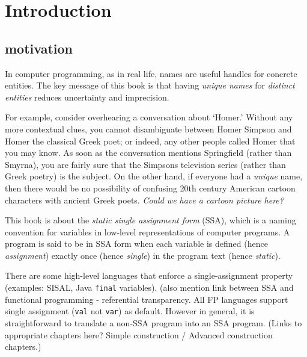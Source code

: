 \chapter{Introduction }



\section{motivation}



In computer programming, as in real life, 
names are useful handles for concrete entities.
The key message of this book is that
having \textit{unique names} for
\textit{distinct entities}
reduces uncertainty and imprecision.

For example, consider overhearing a conversation
about `Homer.' Without any more contextual clues, you
cannot disambiguate between Homer Simpson and Homer the
classical Greek poet; or indeed, any other people
called Homer that you may know.
As soon as the conversation mentions Springfield
(rather than Smyrna), you are fairly sure that the
Simpsons television series (rather than Greek poetry)
is the subject.
On the other hand, if everyone had a \textit{unique} name,
then there would be no possibility of confusing 20th century
American cartoon characters with ancient Greek poets.
\textit{Could we have a cartoon picture here?}

This book is about the \textit{static single assignment form} (SSA),
which is a naming convention for variables in low-level representations
of computer programs.
A program is said to be in SSA form when each variable is defined (hence
\textit{assignment})
exactly once (hence \textit{single}) in the program text
(hence \textit{static}).

There are some high-level languages that enforce
a single-assignment property (examples: SISAL, Java \texttt{final} variables). 
(also mention link between SSA and functional programming -
referential transparency. All FP languages support single assignment
(\texttt{val} not \texttt{var}) as default.
However in general,
it is straightforward to translate a non-SSA program into an SSA
program. (Links to appropriate chapters here?
Simple construction / Advanced construction chapters.)

